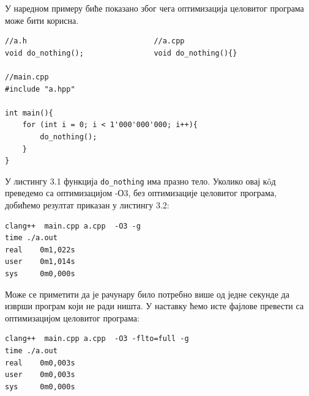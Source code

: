 \documentclass[12pt,oneside]{memoir}
\begin{document}
У наредном примеру биће показано због чега оптимизација целовитог програма 
може бити корисна.

\begin{lstlisting}[frame=single,caption={Пример позивања функције без тела}, captionpos=b]
//a.h                             //a.cpp
void do_nothing();                void do_nothing(){} 

//main.cpp          
#include "a.hpp"

int main(){
    for (int i = 0; i < 1'000'000'000; i++){
        do_nothing();
    }
}
\end{lstlisting}

У листингу 3.1  функција  \texttt{do{\_}nothing} има празно тело.
Уколико овај к\^{o}д преведемо са оптимизацијом -О3, без оптимизације целовитог програма, добићемо  резултат приказан у листингу 3.2:

\begin{lstlisting}[frame=single, caption={Резултат са оптимизацијом целовитог програма}, captionpos=b]
clang++  main.cpp a.cpp  -O3 -g
time ./a.out 
real    0m1,022s
user    0m1,014s
sys     0m0,000s
\end{lstlisting}

Може се приметити да је рачунару било потребно више од једне секунде да изврши програм који не ради ништа.
У наставку ћемо исте фајлове превести са оптимизацијом целовитог програма:
\begin{lstlisting}[frame=single, caption={Резултат без оптимизације целовитог програма}, captionpos=b]
clang++  main.cpp a.cpp  -O3 -flto=full -g
time ./a.out 
real    0m0,003s
user    0m0,003s
sys     0m0,000s
\end{lstlisting}
\end{document}
